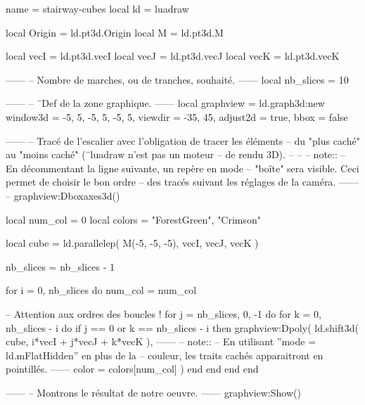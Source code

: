 \documentclass[border = 3pt]{standalone}
\begin{document}
\begin{luadraw*}{name = stairway-cubes}
local ld = luadraw

local Origin = ld.pt3d.Origin
local M      = ld.pt3d.M

local vecI = ld.pt3d.vecI
local vecJ = ld.pt3d.vecJ
local vecK = ld.pt3d.vecK

------
-- Nombre de marches, ou de tranches, souhaité.
------
local nb_slices = 10

------
-- ¨Def de la zone graphique.
------
local graphview = ld.graph3d:new{
  window3d = {-5, 5, -5, 5, -5, 5},
  viewdir  = {-35, 45},
  adjust2d = true,
  bbox     = false
}

------
-- Tracé de l'escalier avec l'obligation de tracer les éléments
-- du "plus caché" au "moins caché" (¨luadraw n'est pas un moteur
-- de rendu 3D).
--
--
-- note::
--     En décommentant la ligne suivante, un repère en mode
--     "boîte" sera visible. Ceci permet de choisir le bon ordre
--     des tracés suivant les réglages de la caméra.
------
-- graphview:Dboxaxes3d()

local num_col = 0
local colors  = {"ForestGreen", "Crimson"}

local cube = ld.parallelep(
  M(-5, -5, -5),
  vecI, vecJ, vecK
)

nb_slices = nb_slices - 1

for i = 0, nb_slices do
  num_col = num_col %

-- Attention aux ordres des boucles !
  for j = nb_slices, 0, -1 do
    for k = 0, nb_slices - i do
      if j == 0 or k == nb_slices - i then
        graphview:Dpoly(
          ld.shift3d(
            cube,
            i*vecI + j*vecJ + k*vecK
          ),
------
-- note::
--     En utilisant ''mode = ld.mFlatHidden'' en plus de la
--     couleur, les traits cachés apparaitront en pointillés.
------
          {color = colors[num_col]}
        )
      end
    end
  end
end

------
-- Montrons le résultat de notre oeuvre.
------
graphview:Show()
\end{luadraw*}
\end{document}
